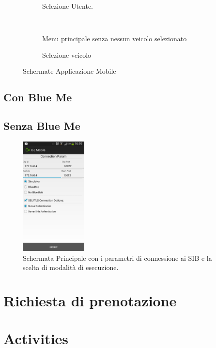 \begin{figure}[H]
        \centering
        \begin{subfigure}[H]{0.3\textwidth}
                \caption{Selezione Utente.}
                \label{fig:select-user}
        \end{subfigure}%
        ~ %
        \begin{subfigure}[H]{0.3\textwidth}
                \caption{Menu principale senza nessun veicolo selezionato}
                \label{fig:main-menu}
        \end{subfigure}
        \begin{subfigure}[H]{0.3\textwidth}
                \caption{Selezione veicolo}
                \label{fig:select-veh}
        \end{subfigure}
        \caption{Schermate Applicazione Mobile}
\end{figure}

\subsection{Con Blue Me}

\subsection{Senza Blue Me}


\begin{figure}
	\centering
	\includegraphics[width=0.3\textwidth]{assets/mobile-app-main.png}
	\caption{Schermata Principale con i parametri di connessione ai SIB e la scelta di modalità di esecuzione.}
	\label{fig:main-activity}
\end{figure}


\section{Richiesta di prenotazione}

\section{Activities}
